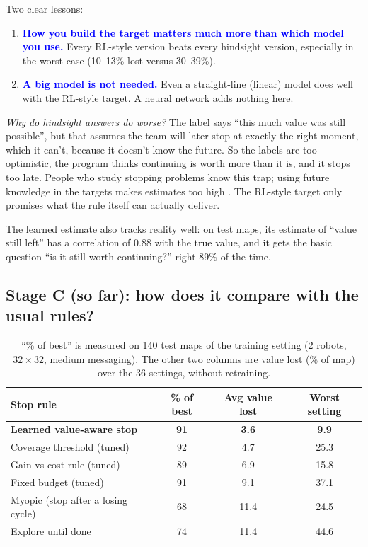 \documentclass[11pt,a4paper]{article}
\newcommand{\key}[1]{\textcolor{blue}{\textbf{#1}}}
\begin{document}
Two clear lessons:
\begin{enumerate}
  \item \key{How you build the target matters much more than which model you use.} Every RL-style version beats every hindsight version, especially in the worst case (10--13\% lost versus 30--39\%).
  \item \key{A big model is not needed.} Even a straight-line (linear) model does well with the RL-style target. A neural network adds nothing here.
\end{enumerate}

\emph{Why do hindsight answers do worse?} The label says ``this much value was still possible'', but that assumes the team will later stop at exactly the right moment, which it can't, because it doesn't know the future. So the labels are too optimistic, the program thinks continuing is worth more than it is, and it stops too late. People who study stopping problems know this trap; using future knowledge in the targets makes estimates too high \cite{longstaff2001}. The RL-style target only promises what the rule itself can actually deliver.

The learned estimate also tracks reality well: on test maps, its estimate of ``value still left'' has a correlation of 0.88 with the true value, and it gets the basic question ``is it still worth continuing?'' right 89\% of the time.

\subsection{Stage C (so far): how does it compare with the usual rules?}

\begin{table}[h]
\centering
\small
\begin{tabular}{lccc}
\toprule
Stop rule & \% of best & Avg value lost & Worst setting \\
\midrule
\textbf{Learned value-aware stop} & \textbf{91} & \textbf{3.6} & \textbf{9.9} \\
Coverage threshold (tuned) & 92 & 4.7 & 25.3 \\
Gain-vs-cost rule (tuned) & 89 & 6.9 & 15.8 \\
Fixed budget (tuned) & 91 & 9.1 & 37.1 \\
Myopic (stop after a losing cycle) & 68 & 11.4 & 24.5 \\
Explore until done & 74 & 11.4 & 44.6 \\
\bottomrule
\end{tabular}
\caption{``\% of best'' is measured on 140 test maps of the training setting (2 robots, $32\times32$, medium messaging). The other two columns are value lost (\% of map) over the 36 settings, without retraining.}
\label{tab:stageC}
\end{table}
\end{document}

